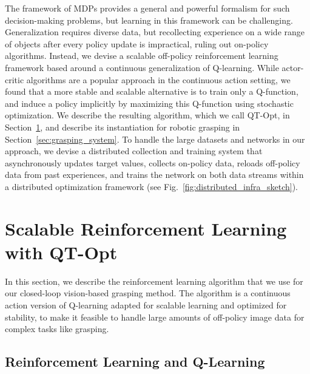 \documentclass{article}
\begin{document}
The framework of MDPs provides a general and powerful formalism for such decision-making problems, but
learning in this framework can be challenging.
Generalization requires diverse data, but recollecting experience on a wide range of objects after every policy update is impractical, ruling out on-policy algorithms. Instead, we devise a scalable off-policy reinforcement learning framework based around a continuous generalization of Q-learning. While actor-critic algorithms are a popular approach in the continuous action setting, we found that a more stable and scalable alternative is to train only a Q-function, and induce a policy implicitly by maximizing this Q-function using stochastic optimization. We describe the resulting algorithm, which we call QT-Opt, in Section~\ref{sec:qtopt}, and describe its instantiation for robotic grasping in Section~\ref{sec:grasping_system}.
To handle the large datasets and networks in our approach, we devise a distributed collection and training system that asynchronously updates target values,
collects on-policy data, reloads off-policy data from past experiences, and trains the network on both data streams within a distributed optimization framework (see Fig.~\ref{fig:distributed_infra_sketch}).






\section{Scalable Reinforcement Learning with QT-Opt}
\label{sec:qtopt}

In this section, we describe the reinforcement learning algorithm that we use for our closed-loop vision-based grasping method. The algorithm is a continuous action version of Q-learning adapted for scalable learning and optimized for stability,
to make it feasible to handle large amounts of off-policy image data for complex tasks like grasping.

\subsection{Reinforcement Learning and Q-Learning}
\label{sec:rlql}
\end{document}
